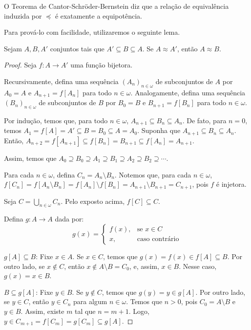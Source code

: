 O Teorema de Cantor-Schröder-Bernstein diz que a relação de equivalência induzida por $\preceq$ é exatamente a equipotência.

Para prová-lo com facilidade, utilizaremos o seguinte lema.

\begin{lemma}[$Z^-$]\label{lem:schroderBernsteinAuxiliar}
    Sejam $A, B, A'$ conjuntos tais que $A'\subseteq B\subseteq A$.
    Se $A\approx A'$, então $A\approx B$.    
\end{lemma}

\begin{proof}
    Seja $f: A\to A'$ uma função bijetora.

    Recursivamente, defina uma sequência $(A_n)_{n\in\omega}$ de subconjuntos de $A$ por $A_0 = A$ e $A_{n+1} = f[A_n]$ para todo $n\in\omega$.
    Analogamente, defina uma sequência $(B_n)_{n\in\omega}$ de subconjuntos de $B$ por $B_0 = B$ e $B_{n+1} = f[B_n]$ para todo $n\in\omega$.

    Por indução, temos que, para todo $n\in\omega$, $A_{n+1}\subseteq B_n\subseteq A_n$.
    De fato, para $n=0$, temos $A_1 = f[A] = A' \subseteq B = B_0 \subseteq A = A_0$.
    Suponha que $A_{n+1}\subseteq B_n\subseteq A_n$.
    Então, $A_{n+2} = f[A_{n+1}] \subseteq f[B_n] = B_{n+1} \subseteq f[A_n] = A_{n+1}$.

    Assim, temos que $A_0\supseteq B_0 \supseteq A_1 \supseteq B_1 \supseteq A_2 \supseteq B_2 \supseteq \cdots$.

    Para cada $n\in\omega$, defina $C_n = A_n\setminus B_n$.
    Notemos que, para cada $n \in \omega$, $f[C_n]=f[A_n\setminus B_n] = f[A_n]\setminus f[B_n] = A_{n+1}\setminus B_{n+1} = C_{n+1}$, pois $f$ é injetora.

    Seja $C=\bigcup_{n\in\omega} C_n$.
    Pelo exposto acima, $f[C]\subseteq C$.

    Defina $g: A\rightarrow A$ dada por:
    \[
        g(x) = \begin{cases}
            f(x), & \text{se } x\in C\\
            x, & \text{caso contrário}
        \end{cases}
    \]

    $g[A]\subseteq B$: Fixe $x \in A$.
    Se $x\in C$, temos que $g(x)=f(x)\in f[A]\subseteq B$.
    Por outro lado, se $x\not\in C$, então $x\notin A\setminus B=C_0$, e, assim, $x \in B$.
    Nesse caso, $g(x)=x\in B$.

    $B\subseteq g[A]$: Fixe $y \in B$.
    Se $y\notin C$, temos que $g(y)=y\in g[A]$.
    Por outro lado, se $y\in C$, então $y\in C_n$ para algum $n\in\omega$.
    Temos que $n>0$, pois $C_0=A\setminus B$ e $y\in B$.
    Assim, existe $m$ tal que $n=m+1$.
    Logo, $y\in C_{m+1} = f[C_m]=g[C_m]\subseteq g[A]$.


\end{proof}
